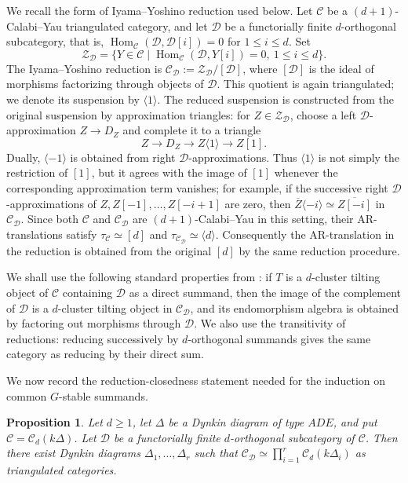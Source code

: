 \documentclass[12pt]{article}
\theoremstyle{plain}
\newtheorem{Prop}[Def]{Proposition}
\theoremstyle{definition}
\DeclareMathOperator{\Hom}{Hom}
\renewcommand{\geq}{\geqslant}
\begin{document}
We recall the form of Iyama--Yoshino reduction used below.  Let
\(\mathcal C\) be a \((d+1)\)-Calabi--Yau triangulated category, and let
\(\mathcal D\) be a functorially finite \(d\)-orthogonal subcategory, that is,
\(\Hom_{\mathcal C}(\mathcal D,\mathcal D[i])=0\) for \(1\le i\le d\).  Set
\[
\mathcal Z_{\mathcal D}
=
\{Y\in\mathcal C\mid
\Hom_{\mathcal C}(\mathcal D,Y[i])=0,\ 1\le i\le d\}.
\]
The Iyama--Yoshino reduction is
\(\mathcal C_{\mathcal D}:=\mathcal Z_{\mathcal D}/[\mathcal D]\), where
\([\mathcal D]\) is the ideal of morphisms factorizing through objects of
\(\mathcal D\).  This quotient is again triangulated; we denote its
suspension by \(\langle1\rangle\).  The reduced suspension is constructed
from the original suspension by approximation triangles: for
\(Z\in\mathcal Z_{\mathcal D}\), choose a left \(\mathcal D\)-approximation
\(Z\to D_Z\) and complete it to a triangle
\[
Z\longrightarrow D_Z\longrightarrow Z\langle1\rangle\longrightarrow Z[1].
\]
Dually, \(\langle-1\rangle\) is obtained from right
\(\mathcal D\)-approximations.  Thus \(\langle1\rangle\) is not simply the
restriction of \([1]\), but it agrees with the image of \([1]\) whenever the
corresponding approximation term vanishes; for example, if the successive
right \(\mathcal D\)-approximations of \(Z,Z[-1],\ldots,Z[-i+1]\) are zero,
then \(\overline Z\langle-i\rangle\simeq\overline{Z[-i]}\) in
\(\mathcal C_{\mathcal D}\).  Since both \(\mathcal C\) and
\(\mathcal C_{\mathcal D}\) are \((d+1)\)-Calabi--Yau in this setting, their
AR-translations satisfy
\(\tau_{\mathcal C}\simeq[d]\) and
\(\tau_{\mathcal C_{\mathcal D}}\simeq\langle d\rangle\).  Consequently the
AR-translation in the reduction is obtained from the original \([d]\) by the
same reduction procedure.

We shall use the following standard properties from \cite{Iyama2008ac}: if
\(T\) is a \(d\)-cluster tilting object of \(\mathcal C\) containing
\(\mathcal D\) as a direct summand, then the image of the complement of
\(\mathcal D\) is a \(d\)-cluster tilting object in
\(\mathcal C_{\mathcal D}\), and its endomorphism algebra is obtained by
factoring out morphisms through \(\mathcal D\).  We also use the transitivity
of reductions: reducing successively by \(d\)-orthogonal summands gives the
same category as reducing by their direct sum.

We now record the reduction-closedness statement needed for the induction on
common \(G\)-stable summands.

\begin{Prop}\label{prop-dynkin-reduction-closed}
Let \(d\geq1\), let \(\Delta\) be a Dynkin diagram of type \(ADE\), and put
\(\mathcal C=\mathcal C_d(k\Delta)\).  Let \(\mathcal D\) be a functorially
finite \(d\)-orthogonal subcategory of \(\mathcal C\).  Then there exist
Dynkin diagrams \(\Delta_1,\ldots,\Delta_r\) such that
\(\mathcal C_{\mathcal D}\simeq \prod_{i=1}^r \mathcal C_d(k\Delta_i)\)
as triangulated categories.
\end{Prop}
\end{document}
